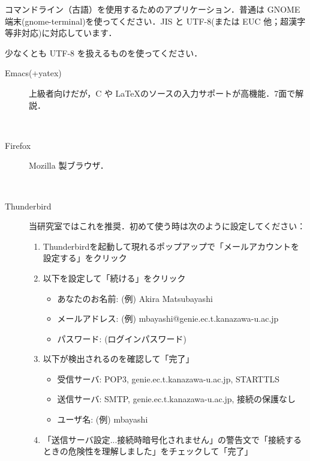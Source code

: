 \documentclass[main]{subfiles}
\begin{document}
\begin{description}[itemsep=0.8em]
    \item[端末エミュレータ] コマンドライン（古語）を使用するためのアプリケーション．普通は GNOME 端末(gnome-terminal)を使ってください．JIS と UTF-8(または EUC 他；超漢字等非対応)に対応しています．
    \item[テキストエディタ] 少なくとも UTF-8 を扱えるものを使ってください．
    \begin{description}
        \item[Emacs(+yatex)] 上級者向けだが，C や \LaTeX のソースの入力サポートが高機能．7面で解説．
    \end{description}
    \item[Web ブラウザ] 　
    \begin{description}
        \item[Firefox] Mozilla 製ブラウザ．
    \end{description}
    \item[メーラー] 　
    \begin{description}
        \item[Thunderbird] 当研究室ではこれを推奨．初めて使う時は次のように設定してください：
        \begin{enumerate}
            \item Thunderbirdを起動して現れるポップアップで「メールアカウントを設定する」をクリック
            \item 以下を設定して「続ける」をクリック
                \begin{itemize}
                    \item あなたのお名前: (例) Akira Matsubayashi
                    \item メールアドレス: (例) mbayashi@genie.ec.t.kanazawa-u.ac.jp
                    \item パスワード: (ログインパスワード)
                \end{itemize}
            \item 以下が検出されるのを確認して「完了」
                \begin{itemize}
                    \item 受信サーバ: POP3, genie.ec.t.kanazawa-u.ac.jp, STARTTLS
                    \item 送信サーバ: SMTP, genie.ec.t.kanazawa-u.ac.jp, 接続の保護なし
                    \item ユーザ名: (例) mbayashi
                \end{itemize}
            \item 「送信サーバ設定...接続時暗号化されません」の警告文で「接続するときの危険性を理解しました」をチェックして「完了」

\end{enumerate}
\end{description}
\end{description}
\end{document}
